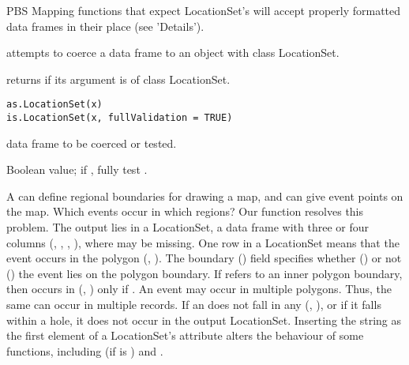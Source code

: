\documentclass[letterpaper]{book}
\begin{document}
%
\begin{Description}\relax
PBS Mapping functions that expect LocationSet's will accept properly
formatted data frames in their place (see 'Details').

 attempts to coerce a data frame to an object with
class LocationSet.

 returns  if its argument is of class
LocationSet.
\end{Description}
%
\begin{Usage}
\begin{verbatim}
as.LocationSet(x)
is.LocationSet(x, fullValidation = TRUE)
\end{verbatim}
\end{Usage}
%
\begin{Arguments}
\begin{ldescription}
\item[\code{x}] data frame to be coerced or tested.
\item[\code{fullValidation}] Boolean value; if , fully test
.
\end{ldescription}
\end{Arguments}
%
\begin{Details}\relax
A  can define regional boundaries for drawing a map, and
 can give event points on the map. Which events occur in
which regions? Our function  resolves this
problem. The output lies in a LocationSet, a data frame with three or
four columns (, , , ), where
 may be missing. One row in a LocationSet means that the event
 occurs in the polygon (, ). The boundary
() field specifies whether () or not
() the event lies on the polygon boundary. If 
refers to an inner polygon boundary, then  occurs in
(, ) only if . An event may occur in
multiple polygons. Thus, the same  can occur in multiple
records. If an  does not fall in any (, ),
or if it falls within a hole, it does not occur in the output
LocationSet. Inserting the string  as the first
element of a LocationSet's  attribute alters the behaviour
of some functions, including  (if
 is ) and .
\end{Details}
\end{document}
